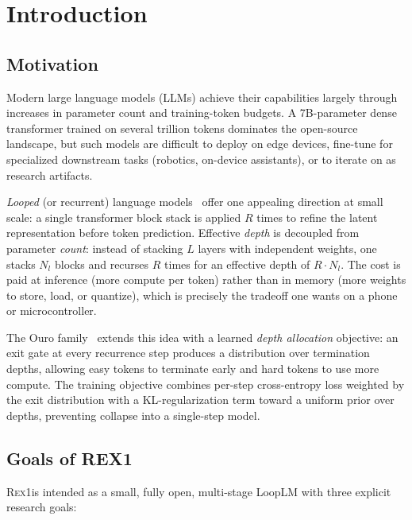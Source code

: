 \documentclass[11pt,a4paper]{article}
\newcommand{\REX}{\textsc{Rex1}\xspace}
\providecommand{\xspace}{}
\begin{document}
\tableofcontents
\newpage

\section{Introduction}

\subsection{Motivation}

Modern large language models (LLMs) achieve their capabilities largely through
increases in parameter count and training-token budgets. A 7B-parameter dense
transformer trained on several trillion tokens dominates the open-source
landscape, but such models are difficult to deploy on edge devices, fine-tune
for specialized downstream tasks (robotics, on-device assistants), or to
iterate on as research artifacts.

\emph{Looped} (or recurrent) language models~\cite{ouro2025,deth} offer one
appealing direction at small scale: a single transformer block stack is
applied $R$ times to refine the latent representation before token prediction.
Effective \emph{depth} is decoupled from parameter \emph{count}: instead of
stacking $L$ layers with independent weights, one stacks $N_l$ blocks and
recurses $R$ times for an effective depth of $R \cdot N_l$. The cost is paid
at inference (more compute per token) rather than in memory (more weights to
store, load, or quantize), which is precisely the tradeoff one wants on a
phone or microcontroller.

The Ouro family~\cite{ouro2025} extends this idea with a learned \emph{depth
allocation} objective: an exit gate at every recurrence step produces a
distribution over termination depths, allowing easy tokens to terminate
early and hard tokens to use more compute. The training objective combines
per-step cross-entropy loss weighted by the exit distribution with a
KL-regularization term toward a uniform prior over depths, preventing
collapse into a single-step model.

\subsection{Goals of REX1}

\REX is intended as a small, fully open, multi-stage LoopLM with three explicit
research goals:
\end{document}
